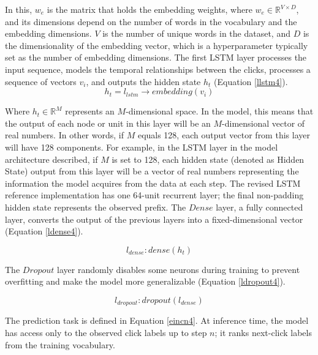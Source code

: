 \documentclass[sn-mathphys-num, Numbered]{sn-jnl}%
\theoremstyle{thmstyleone}%
\theoremstyle{thmstyletwo}%
\theoremstyle{thmstylethree}%
\providecommand{\DIFadd}[1]{{\protect\color{green!40!black}#1}} %
\providecommand{\DIFdel}[1]{}                      %
\providecommand{\DIFaddbegin}{} %
\providecommand{\DIFaddend}{} %
\providecommand{\DIFdelbegin}{} %
\providecommand{\DIFdelend}{} %
\newcommand{\DIFscaledelfig}{0.5}
\newlength{\DIFdelgraphicswidth} %
\newlength{\DIFdelgraphicsheight} %
\newcommand{\DIFaddincludegraphics}[2][]{{\color{blue}\fbox{\DIFOincludegraphics[#1]{#2}}}} %
\newcommand{\DIFdelincludegraphics}[2][]{%
\sbox{\DIFdelgraphicsbox}{\DIFOincludegraphics[#1]{#2}}%
\settoboxwidth{\DIFdelgraphicswidth}{\DIFdelgraphicsbox} %
\settoboxtotalheight{\DIFdelgraphicsheight}{\DIFdelgraphicsbox} %
\scalebox{\DIFscaledelfig}{%
\parbox[b]{\DIFdelgraphicswidth}{\usebox{\DIFdelgraphicsbox}\\[-\baselineskip] \rule{\DIFdelgraphicswidth}{0em}}\llap{\resizebox{\DIFdelgraphicswidth}{\DIFdelgraphicsheight}{%
\setlength{\unitlength}{\DIFdelgraphicswidth}%
\begin{picture}(1,1)%
\thicklines\linethickness{2pt} %
{\color[rgb]{1,0,0}\put(0,0){\framebox(1,1){}}}%
{\color[rgb]{1,0,0}\put(0,0){\line( 1,1){1}}}%
{\color[rgb]{1,0,0}\put(0,1){\line(1,-1){1}}}%
\end{picture}%
}\hspace*{3pt}}} %
} %
\DeclareRobustCommand{\DIFaddbegin}{\DIFOaddbegin \let\includegraphics\DIFaddincludegraphics} %
\DeclareRobustCommand{\DIFaddend}{\DIFOaddend \let\includegraphics\DIFOincludegraphics} %
\DeclareRobustCommand{\DIFdelbegin}{\DIFOdelbegin \let\includegraphics\DIFdelincludegraphics} %
\DeclareRobustCommand{\DIFdelend}{\DIFOaddend \let\includegraphics\DIFOincludegraphics} %
\begin{document}
In this, $w_e$ is the matrix that holds the embedding weights, where $w_e \in \mathbb{R}^{V \times D}$, and its dimensions depend on the number of words in the vocabulary and the embedding dimensions. $V$ is the number of unique words in the dataset, and $D$ is the dimensionality of the embedding vector, which is a hyperparameter typically set as the number of embedding dimensions.
The first LSTM layer processes the input sequence, models the temporal relationships between the clicks, processes a sequence of vectors $v_i$, and outputs the hidden state $h_t$ (Equation \ref{llstm4}).
\begin{equation}\label{llstm4}
	h_t = l_{lstm} \rightarrow embedding(v_i)
\end{equation}

Where $h_t \in \mathbb{R}^M$ represents an $M$-dimensional space. In the model, this means that the output of each node or unit in this layer will be an $M$-dimensional vector of real numbers. In other words, if $M$ equals 128, each output vector from this layer will have 128 components. For example, in the LSTM layer in the model architecture described, if $M$ is set to 128, each hidden state (denoted as Hidden State) output from this layer will be a vector of real numbers representing the information the model acquires from the data at each step.
The \DIFdelbegin \DIFdel{second LSTM layer processes the output of the first layer and extracts further information from the temporal sequence}\DIFdelend \DIFaddbegin \DIFadd{revised LSTM reference implementation has one 64-unit recurrent layer; the final non-padding hidden state represents the observed prefix}\DIFaddend .
The $Dense$ layer, a fully connected layer, converts the output of the previous layers into a fixed-dimensional vector (Equation \ref{ldense4}).

\begin{equation}\label{ldense4}
	l_{dense} : dense(h_t )
\end{equation}

The $Dropout$ layer randomly disables some neurons during training to prevent overfitting and make the model more generalizable (Equation \ref{ldropout4}).

\begin{equation}\label{ldropout4}
	l_{dropout} : dropout(l_{dense})
\end{equation}

\DIFdelbegin \DIFdel{As a result, the problem of predicting the next user click is defined as (Equation \ref{eincn4}). }\DIFdelend \DIFaddbegin \DIFadd{The prediction task is defined in Equation \ref{eincn4}. At inference time, the model has access only to the observed click labels up to step $n$; it ranks next-click labels from the training vocabulary.
}\DIFaddend 
\end{document}
